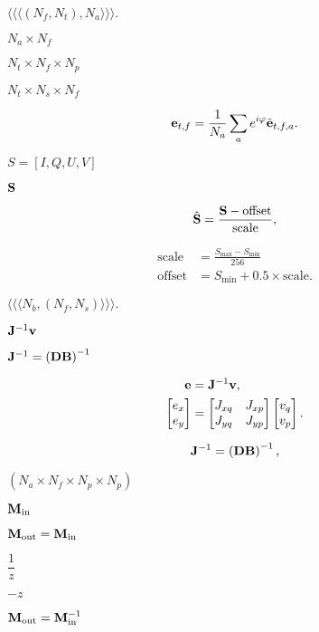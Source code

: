 \documentclass{article}
\begin{document}
$\langle\langle\langle(N_f, N_t), N_a\rangle\rangle\rangle.$
\pagebreak

$N_a \times N_f$
\pagebreak

$N_t \times N_f \times N_p$
\pagebreak

$N_t \times N_s \times N_f$
\pagebreak

\[ {\bf e}_{t,f} = \frac{1}{N_a} \sum_a e^{i\varphi} \tilde{\bf e}_{t,f,a}. \]
\pagebreak

$S = [I, Q, U, V]$
\pagebreak

${\bf S}$
\pagebreak

\[ \hat{\bf S} = \frac{{\bf S} - \text{offset}}{\text{scale}}, \]
\pagebreak

\begin{align*} \text{scale} &= \frac{S_\text{max} - S_\text{min}}{256} \\ \text{offset} &= S_\text{min} + 0.5 \times \text{scale}. \end{align*}
\pagebreak

$\langle\langle\langle N_b,(N_f, N_s)\rangle\rangle\rangle.$
\pagebreak

${\bf J}^{-1} {\bf v}$
\pagebreak

${\bf J}^{-1} = \left({\bf D}{\bf B}\right)^{-1}$
\pagebreak

\[ \begin{aligned} {\bf e} &= {\bf J}^{-1} {\bf v}, \\ \begin{bmatrix} e_x \\ e_y \end{bmatrix} &= \begin{bmatrix} J_{xq} & J_{xp} \\ J_{yq} & J_{yp} \end{bmatrix} \begin{bmatrix} v_q \\ v_p \end{bmatrix}. \end{aligned} \]
\pagebreak

\[{\bf J}^{-1} = \left({\bf D}{\bf B}\right)^{-1},\]
\pagebreak

$(N_a \times N_f \times N_p \times N_p)$
\pagebreak

${\bf M}_\text{in}$
\pagebreak

${\bf M}_\text{out} = {\bf M}_\text{in}$
\pagebreak

$\dfrac{1}{z}$
\pagebreak

$-z$
\pagebreak

${\bf M}_\text{out} = {\bf M}_\text{in}^{-1}$
\pagebreak
\end{document}

